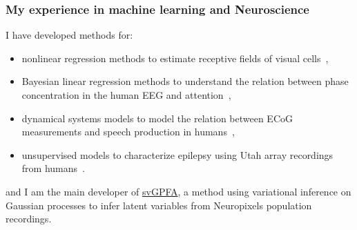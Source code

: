 
\begin{frame}
    \frametitle{My experience in machine learning and Neuroscience}

    I have developed methods for:

    \begin{itemize}

        \item nonlinear regression methods to estimate receptive fields of
            visual cells~\citep{rapelaEtAl06,rapelaEtAl10},

        \item Bayesian linear regression methods to understand the relation
            between phase concentration in the human EEG and
            attention~\citep{rapelaEtAl12-attentionSwitch,rapelaEtAl12-eyeTracking,rapelaEtAl18-avshift},

        \item dynamical systems models to model the relation between ECoG
            measurements and speech production in
            humans~\citep{rapelaInPrepTWsInSpeech,rapelaInPrepSyncTWs,rapelaInPrepSyncTWsII},

        \item unsupervised models to characterize epilepsy using Utah array
            recordings from
            humans~\citep{rapelaEtAl19-epilepsy-tsne,rapelaAndTodorov19-epilepsy-hmm}.

    \end{itemize}

    and I am the main developer of
    \href{https://github.com/joacorapela/svGPFA}{svGPFA}, a method using
    variational inference on Gaussian processes to infer latent variables from
    Neuropixels population recordings.

\end{frame}

